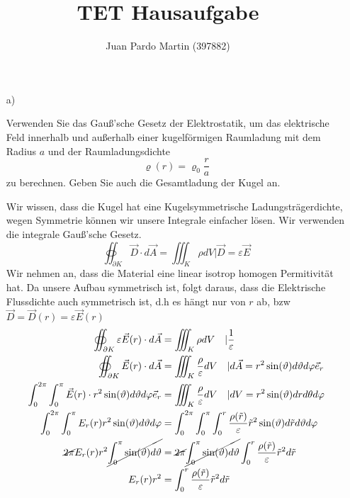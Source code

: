 \documentclass{scrartcl}
\title{TET Hausaufgabe}
\author{Juan Pardo Martin (397882)}
\let\*\cdot
\begin{document}
\maketitle
\begin{itemize}
\item[a)] 
  
Verwenden Sie das Gauß’sche Gesetz der Elektrostatik, um das elektrische Feld innerhalb und außerhalb einer kugelförmigen Raumladung mit dem Radius $a$ und der Raumladungsdichte
\[\varrho(r)=\varrho_0 \frac{r}{a}\]
zu berechnen. Geben Sie auch die Gesamtladung der Kugel an.

Wir wissen, dass die Kugel hat eine Kugelsymmetrische Ladungsträgerdichte, wegen Symmetrie können wir unsere Integrale einfacher lösen.
Wir verwenden die integrale Gauß’sche Gesetz. 
\[\oiint_{\partial K} \vec{D} \* d \vec{A} = \iiint_{K} \rho dV | \vec{D}=\varepsilon \vec{E}\]
Wir nehmen an, dass die Material eine linear isotrop homogen Permitivität hat.
Da unsere Aufbau symmetrisch ist, folgt daraus, dass die Elektrische Flussdichte auch symmetrisch ist, d.h es hängt nur von $r$ ab, bzw $\vec{D}=\vec{D}(r)=\varepsilon \vec{E}(r)$
      \begin{align}
        \oiint_{\partial K} \varepsilon\vec{E}(r) \* d \vec{A} &= \iiint_{K} \rho dV \quad| \frac{1}{\varepsilon} \nonumber\\
        \oiint_{\partial K} \vec{E}(r) \* d \vec{A} &= \iiint_{K} \frac{\rho}{\varepsilon} dV \quad| d \vec{A} = r^2 \sin(\vartheta) d\vartheta d\varphi \vec{e}_r \nonumber\\
\int_0^{2\pi} \int_0^\pi \vec{E}(r) \* r^2 \sin(\vartheta) d\vartheta d\varphi \vec{e}_r &= \iiint_{K} \frac{\rho}{\varepsilon} dV \quad| dV= r^2\sin(\vartheta)dr d\theta d\varphi \nonumber\\
\int_0^{2\pi} \int_0^\pi E_r(r)  r^2 \sin(\vartheta) d\vartheta d\varphi  &=\int_0^{2\pi} \int_0^\pi \int_0^r \frac{\rho(\tilde{r})}{\varepsilon} \tilde{r}^2\sin(\vartheta)d\tilde{r} d\vartheta d\varphi \label{eq:1}\\
\cancel{2\pi} E_r(r)  r^2 \cancel{\int_0^\pi \sin(\vartheta) d\vartheta}  &=\cancel{2\pi} \cancel{\int_0^\pi \sin(\vartheta) d\vartheta} \int_0^r \frac{\rho(\tilde{r})}{\varepsilon} \tilde{r}^2d\tilde{r} \nonumber\\
 E_r(r)  r^2   &=\int_0^r \frac{\rho(\tilde{r})}{\varepsilon} \tilde{r}^2d\tilde{r} \nonumber
    \end{align}


\end{itemize}
\end{document}
